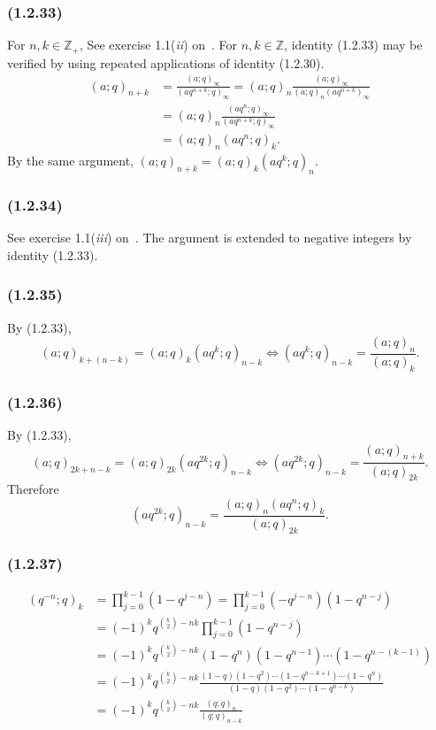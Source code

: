 \subsubsection*{(1.2.33)}
For $n,k\in\mathbb{Z}_+$, See exercise 1.1(\textit{ii}) on~.
For $n,k\in\mathbb{Z}$, identity (1.2.33) may be verified by using repeated applications of identity (1.2.30).
\begin{align*}
    (a;q)_{n+k}&=\frac{(a;q)_\infty}{(aq^{n+k};q)_\infty}
    = (a;q)_n \frac{(a;q)_\infty}{(a;q)_n(aq^{n+k})_\infty}\\[0.5em]
    &= (a;q)_n\frac{(aq^n;q)_{\infty}}{(aq^{n+k};q)_\infty}\\[0.5em]
    &= (a;q)_n(aq^n;q)_k.
\end{align*}
By the same argument, $(a;q)_{n+k}=(a;q)_k(aq^k;q)_n.$

\subsubsection*{(1.2.34)}
See exercise 1.1(\textit{iii}) on~.
The argument is extended to negative integers by identity (1.2.33).

\subsubsection*{(1.2.35)}
By (1.2.33),
\[
    (a;q)_{k+(n-k)} = (a;q)_k(aq^k;q)_{n-k} \iff (aq^k;q)_{n-k} = \frac{(a;q)_n}{(a;q)_k}.
\]

\subsubsection*{(1.2.36)}
By (1.2.33),
\[
    (a;q)_{2k+n-k}=(a;q)_{2k} (aq^{2k};q)_{n-k} \iff (aq^{2k};q)_{n-k}= \frac{(a;q)_{n+k}}{(a;q)_{2k}}.
\]
Therefore
\[
    (aq^{2k};q)_{n-k}= \frac{(a;q)_n (aq^n;q)_k}{(a;q)_{2k}}.
\]

\subsubsection*{(1.2.37)}
\begin{align*}
    (q^{-n};q)_k &= \prod_{j=0}^{k-1} (1-q^{j-n}) = \prod_{j=0}^{k-1} (-q^{j-n})(1-q^{n-j}) \\
    &= (-1)^k q^{\binom{k}{2}-nk} \prod_{j=0}^{k-1} (1-q^{n-j}) \\
    &= (-1)^k q^{\binom{k}{2}-nk} (1-q^n)(1-q^{n-1})\cdots(1-q^{n-(k-1)}) \\
    &= (-1)^k q^{\binom{k}{2}-nk} \frac{(1-q)(1-q^2)\cdots(1-q^{n-k+1})\cdots(1-q^n)}{(1-q)(1-q^2)\cdots(1-q^{n-k})}\\
    &= (-1)^k q^{\binom{k}{2}-nk} \frac{(q;q)_n}{(q;q)_{n-k}}\\
\end{align*}

